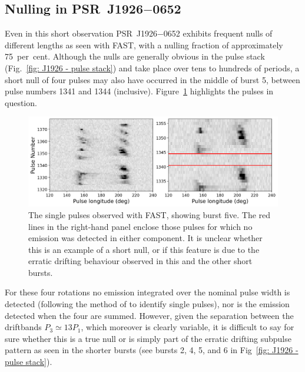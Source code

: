 \subsection{Nulling in \texorpdfstring{PSR~J1926$-$0652}{PSR~J1926--0652}}
\label{sec: J1926 - analysis - nulling}
Even in this short observation PSR~J1926$-$0652 exhibits frequent nulls of different lengths as seen with FAST, with a nulling fraction of approximately 75~per~cent. Although the nulls are generally obvious in the pulse stack (Fig.~\ref{fig: J1926 - pulse stack}) and take place over tens to hundreds of periods, a short null of four pulses may also have occurred in the middle of burst 5, between pulse numbers 1341 and 1344 (inclusive). Figure~\ref{fig: J1926 - burst five null} highlights the pulses in question.
\begin{figure}
    \begin{center}
        \includegraphics[width=1.0\textwidth]{Figures/J1926/burst_5}
        \caption[Burst 5 of PSR~J1926$-$0652 showing the possible null]{The single pulses observed with FAST, showing burst five. The red lines in the right-hand panel enclose those pulses for which no emission was detected in either component. It is unclear whether this is an example of a short null, or if this feature is due to the erratic drifting behaviour observed in this and the other short bursts.}
        \label{fig: J1926 - burst five null}
    \end{center}
\end{figure}
For these four rotations no emission integrated over the nominal pulse width is detected (following the method of \citet{BGGx2010} to identify single pulses), nor is the emission detected when the four are summed.
However, given the separation between the driftbands $P_3 \simeq 13P_1$, which moreover is clearly variable, it is  difficult to say for sure whether this is a true null or is simply part of the erratic drifting subpulse pattern as seen in the shorter bursts (see bursts 2, 4, 5, and 6 in Fig~\ref{fig: J1926 - pulse stack}).

